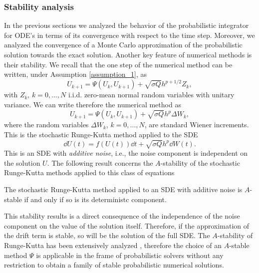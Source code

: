 \subsubsection{Stability analysis}

In the previous sections we analyzed the behavior of the probabilistic integrator for ODE's in terms of its convergence with respect to the time step. Moreover, we analyzed the convergence of a Monte Carlo approximation of the probabilistic solution towards the exact solution. Another key feature of numerical methods is their stability. We recall that the one step of the numerical method can be written, under Assumption \ref{assumption_1}, as
\begin{equation}
	U_{k+1} = \Psi(U_{k}, U_{k+1}) + \sqrt{\sigma Q}h^{p+1/2}Z_k,
\end{equation}
with $Z_k$, $k = 0, \ldots, N$ i.i.d. zero-mean normal random variables with unitary variance. We can write therefore the numerical method as
\begin{equation}
	U_{k+1} = \Psi(U_{k}, U_{k+1}) + \sqrt{\sigma Q}h^{p}\Delta W_k,
\end{equation}
where the random variables $\Delta W_k$, $k = 0, \ldots, N$, are standard Wiener increments. This is the stochastic Runge-Kutta method applied to the SDE
\begin{equation}
	\dd U(t) = f(U(t))\dd t + \sqrt{\sigma Q}h^p \dd W(t).
\end{equation}
This is an SDE with \textit{additive noise}, i.e., the noise component is independent on the solution $U$. The following result concerns the $A$-stability of the stochastic Runge-Kutta methods applied to this class of equations \cite[Theorem 4.1.]{HeS92}
\begin{theorem} The stochastic Runge-Kutta method applied to an SDE with additive noise is $A$-stable if and only if so is its deterministc component.
\end{theorem}
\noindent This stability results is a direct consequence of the independence of the noise component on the value of the solution itself. Therefore, if the approximation of the drift term is stable, so will be the solution of the full SDE. The $A$-stability of Runge-Kutta has been extensively analyzed \cite{HaW96}, therefore the choice of an $A$-stable method $\Psi$ is applicable in the frame of probabilistic solvers without any restriction to obtain a family of stable probabilistic numerical solutions.
